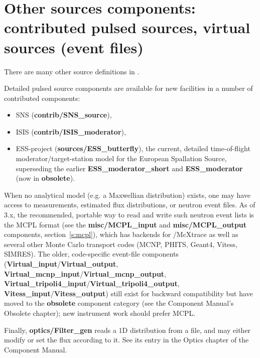 





\newpage


%

\newpage




\newpage




\newpage
\section{Other sources components: contributed pulsed sources, virtual sources (event files)}
\label{sources-seealso}

There are many other source definitions in \MCS .

Detailed pulsed source components are available for new facilities
in a number of contributed components:
\begin{itemize}
\item SNS (\textbf{contrib/SNS\_source}),
\item ISIS (\textbf{contrib/ISIS\_moderator}),
\item ESS-project (\textbf{sources/ESS\_butterfly}), the current, detailed
  time-of-flight moderator/target-station model for the European Spallation
  Source, superseding the earlier \textbf{ESS\_moderator\_short} and
  \textbf{ESS\_moderator} (now in \textbf{obsolete}).
\end{itemize}

When no analytical model (e.g. a Maxwellian distribution) exists,
one may have access to measurements, estimated flux distributions, or
neutron event files. As of \MCS 3.x, the recommended, portable way to read
and write such neutron event lists is the MCPL format (see the
\textbf{misc/MCPL\_input} and \textbf{misc/MCPL\_output} components,
section~\ref{s:mcpl}), which has backends for \MCS/McXtrace as well as
several other Monte Carlo transport codes (MCNP, PHITS, Geant4, Vitess,
SIMRES). The older, code-specific event-file components
(\textbf{Virtual\_input}/\textbf{Virtual\_output},
\textbf{Virtual\_mcnp\_input}/\textbf{Virtual\_mcnp\_output},
\textbf{Virtual\_tripoli4\_input}/\textbf{Virtual\_tripoli4\_output},
\textbf{Vitess\_input}/\textbf{Vitess\_output}) still exist for backward
compatibility but have moved to the \textbf{obsolete} component category
(see the Component Manual's Obsolete chapter); new instrument work should
prefer MCPL.  

Finally, \textbf{optics/Filter\_gen} reads a 1D distribution from a file,
and may either modify or set the flux according to it. See its entry in
the Optics chapter of the Component Manual.
